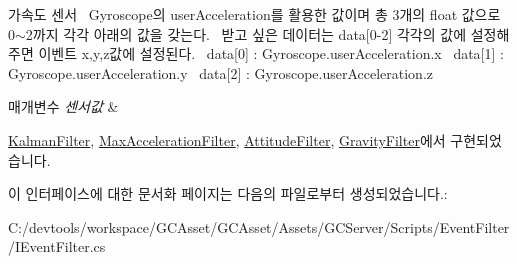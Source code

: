 \begin{DoxyItemize}
\item 가속도 센서~\newline
 Gyroscope의 user\+Acceleration를 활용한 값이며 총 3개의 float 값으로 0$\sim$2까지 각각 아래의 값을 갖는다.~\newline
 받고 싶은 데이터는 data\mbox{[}0-\/2\mbox{]} 각각의 값에 설정해주면 이벤트 x,y,z값에 설정된다.~\newline
 data\mbox{[}0\mbox{]} \+: Gyroscope.\+user\+Acceleration.\+x~\newline
 data\mbox{[}1\mbox{]} \+: Gyroscope.\+user\+Acceleration.\+y~\newline
 data\mbox{[}2\mbox{]} \+: Gyroscope.\+user\+Acceleration.\+z~\newline
 
\begin{DoxyParams}{매개변수}
{\em 센서값} & \\
\hline
\end{DoxyParams}

\end{DoxyItemize}

\hyperlink{class_kalman_filter_a9a7d63d4acea7ce12b83b00f9d02f7cb}{Kalman\+Filter}, \hyperlink{class_max_acceleration_filter_a59cde31f8ac45c09cb6636cc140feea6}{Max\+Acceleration\+Filter}, \hyperlink{class_attitude_filter_a91c49319cb969aae2a5b28948eeac963}{Attitude\+Filter}, \hyperlink{class_gravity_filter_ad397d715404a4057f13631b1b9978903}{Gravity\+Filter}에서 구현되었습니다.



이 인터페이스에 대한 문서화 페이지는 다음의 파일로부터 생성되었습니다.\+:\begin{DoxyCompactItemize}
\item 
C\+:/devtools/workspace/\+G\+C\+Asset/\+G\+C\+Asset/\+Assets/\+G\+C\+Server/\+Scripts/\+Event\+Filter/I\+Event\+Filter.\+cs\end{DoxyCompactItemize}
